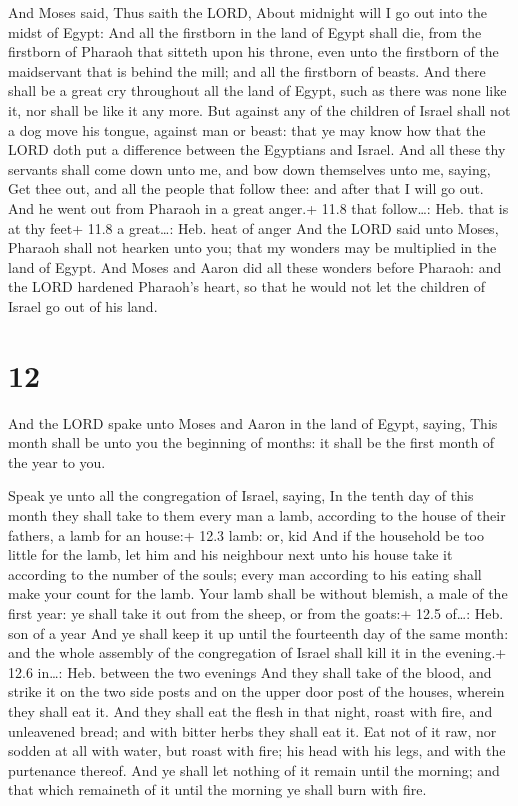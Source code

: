  And Moses said, Thus saith the LORD, About midnight will I
go out into the midst of Egypt:  And all the firstborn in
the land of Egypt shall die, from the firstborn of Pharaoh that sitteth
upon his throne, even unto the firstborn of the maidservant that is
behind the mill; and all the firstborn of beasts.  And there
shall be a great cry throughout all the land of Egypt, such as there was
none like it, nor shall be like it any more.  But against
any of the children of Israel shall not a dog move his tongue, against
man or beast: that ye may know how that the LORD doth put a difference
between the Egyptians and Israel.  And all these thy
servants shall come down unto me, and bow down themselves unto me,
saying, Get thee out, and all the people that follow thee: and after
that I will go out. And he went out from Pharaoh in a great anger.+ 11.8
that follow\ldots: Heb. that is at thy feet+ 11.8 a great\ldots: Heb.
heat of anger  And the LORD said unto Moses, Pharaoh shall
not hearken unto you; that my wonders may be multiplied in the land of
Egypt.  And Moses and Aaron did all these wonders before
Pharaoh: and the LORD hardened Pharaoh's heart, so that he would not let
the children of Israel go out of his land.

\hypertarget{section-11}{%
\section{12}\label{section-11}}

 And the LORD spake unto Moses and Aaron in the land of
Egypt, saying,  This month shall be unto you the beginning
of months: it shall be the first month of the year to you.

 Speak ye unto all the congregation of Israel, saying, In
the tenth day of this month they shall take to them every man a lamb,
according to the house of their fathers, a lamb for an house:+ 12.3
lamb: or, kid  And if the household be too little for the
lamb, let him and his neighbour next unto his house take it according to
the number of the souls; every man according to his eating shall make
your count for the lamb.  Your lamb shall be without
blemish, a male of the first year: ye shall take it out from the sheep,
or from the goats:+ 12.5 of\ldots: Heb. son of a year  And
ye shall keep it up until the fourteenth day of the same month: and the
whole assembly of the congregation of Israel shall kill it in the
evening.+ 12.6 in\ldots: Heb. between the two evenings  And
they shall take of the blood, and strike it on the two side posts and on
the upper door post of the houses, wherein they shall eat it.
 And they shall eat the flesh in that night, roast with
fire, and unleavened bread; and with bitter herbs they shall eat it.
 Eat not of it raw, nor sodden at all with water, but roast
with fire; his head with his legs, and with the purtenance thereof.
 And ye shall let nothing of it remain until the morning;
and that which remaineth of it until the morning ye shall burn with
fire.

